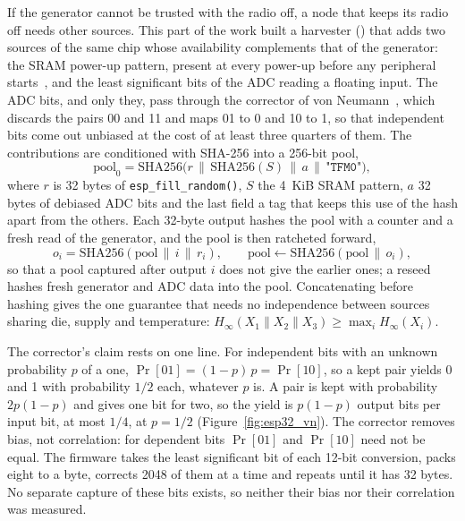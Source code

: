 If the generator cannot be trusted with the radio off, a node that keeps
its radio off needs other sources. This part of the work built a
harvester () that adds
two sources of the same chip whose availability complements that of the
generator: the SRAM power-up pattern, present at every power-up before
any peripheral starts~\cite{holcomb_2009_powerup}, and the least
significant bits of the ADC reading a floating input. The ADC bits, and
only they, pass through
the corrector of von Neumann~\cite{vonneumann_1951_various}, which
discards the pairs 00 and 11 and maps 01 to 0 and 10 to 1, so that
independent bits come out unbiased at the cost of at least three quarters
of them. The contributions are conditioned with SHA-256 into a 256-bit
pool,
\begin{equation}
\mathrm{pool}_0 = \mathrm{SHA256}\bigl(r \,\|\, \mathrm{SHA256}(S) \,\|\,
a \,\|\, \texttt{"TFM0"}\bigr),
\label{eq:esp32_pool}
\end{equation}
where $r$ is 32 bytes of \texttt{esp\_fill\_random()}, $S$ the 4~KiB SRAM
pattern, $a$ 32 bytes of debiased ADC bits and the last field a tag that
keeps this use of the hash apart from the others. Each 32-byte output
hashes the pool with a counter and a fresh read of the generator, and the
pool is then ratcheted forward,
\begin{equation}
o_i = \mathrm{SHA256}(\mathrm{pool} \,\|\, i \,\|\, r_i), \qquad
\mathrm{pool} \leftarrow \mathrm{SHA256}(\mathrm{pool} \,\|\, o_i),
\label{eq:esp32_ratchet}
\end{equation}
so that a pool captured after output $i$ does not give the earlier ones;
a reseed hashes fresh generator and ADC data into the pool. Concatenating
before hashing gives the one guarantee that needs no independence between
sources sharing die, supply and temperature:
$H_\infty(X_1 \| X_2 \| X_3) \geq \max_i H_\infty(X_i)$.

The corrector's claim rests on one line. For independent bits with an
unknown probability $p$ of a one, $\Pr[01] = (1-p)\,p = \Pr[10]$, so a kept
pair yields 0 and 1 with probability $1/2$ each, whatever $p$ is. A pair
is kept with probability $2p(1-p)$ and gives one bit for two, so the
yield is $p(1-p)$ output bits per input bit, at most $1/4$, at $p = 1/2$
(Figure~\ref{fig:esp32_vn}). The corrector removes bias, not correlation:
for dependent bits $\Pr[01]$ and $\Pr[10]$ need not be equal. The firmware
takes the least significant bit of each 12-bit conversion, packs eight to
a byte, corrects 2048 of them at a time and repeats until it has 32
bytes. No separate capture of these bits exists, so neither their bias
nor their correlation was measured.

